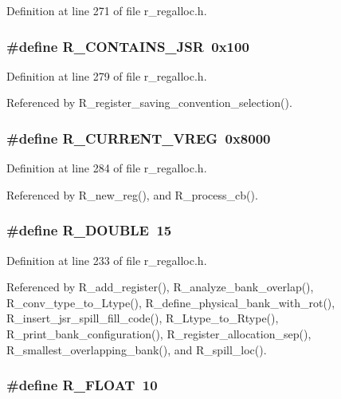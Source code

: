 Definition at line 271 of file r\_\-regalloc.h.
\subsubsection{\setlength{\rightskip}{0pt plus 5cm}\#define R\_\-CONTAINS\_\-JSR~0x100}\label{r__regalloc_8h_a6cde4579456921fec98ee290daca821}




Definition at line 279 of file r\_\-regalloc.h.

Referenced by R\_\-register\_\-saving\_\-convention\_\-selection().
\subsubsection{\setlength{\rightskip}{0pt plus 5cm}\#define R\_\-CURRENT\_\-VREG~0x8000}\label{r__regalloc_8h_4c7b72b10e355f8e5e371482b71d5bc6}




Definition at line 284 of file r\_\-regalloc.h.

Referenced by R\_\-new\_\-reg(), and R\_\-process\_\-cb().
\subsubsection{\setlength{\rightskip}{0pt plus 5cm}\#define R\_\-DOUBLE~15}\label{r__regalloc_8h_38761686c8b8293b31fb5a57cd529c92}




Definition at line 233 of file r\_\-regalloc.h.

Referenced by R\_\-add\_\-register(), R\_\-analyze\_\-bank\_\-overlap(), R\_\-conv\_\-type\_\-to\_\-Ltype(), R\_\-define\_\-physical\_\-bank\_\-with\_\-rot(), R\_\-insert\_\-jsr\_\-spill\_\-fill\_\-code(), R\_\-Ltype\_\-to\_\-Rtype(), R\_\-print\_\-bank\_\-configuration(), R\_\-register\_\-allocation\_\-sep(), R\_\-smallest\_\-overlapping\_\-bank(), and R\_\-spill\_\-loc().
\subsubsection{\setlength{\rightskip}{0pt plus 5cm}\#define R\_\-FLOAT~10}\label{r__regalloc_8h_3d018b79b3eec30b6a14c8b4ff5a9123}




